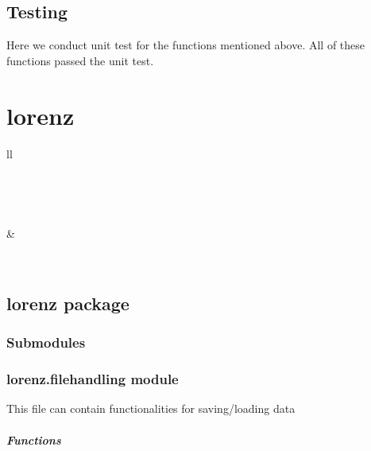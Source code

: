 \documentclass[letterpaper,10pt,english]{sphinxmanual}
\begin{document}
\section{Testing}
\label{ProblemStatement:testing}
Here we conduct unit test for the functions mentioned above. All of these functions passed the unit test.

\chapter{lorenz}
\label{modules:lorenz}\label{modules::doc}
\begin{longtable}{ll}
\hline
\endfirsthead

%
{{}} \\
\hline
\endhead

\hline {} \\ \hline
\endfoot

\endlastfoot


{\hyperref[_autosummary/lorenz:module\string-lorenz]{}}
 & 

\\
\hline\end{longtable}



\section{lorenz package}
\label{_autosummary/lorenz::doc}\label{_autosummary/lorenz:lorenz-package}

\subsection{Submodules}
\label{_autosummary/lorenz:submodules}

\subsection{lorenz.filehandling module}
\label{_autosummary/lorenz:module-lorenz.filehandling}\label{_autosummary/lorenz:lorenz-filehandling-module}
This file can contain functionalities for saving/loading data
\paragraph{Functions}
\end{document}
